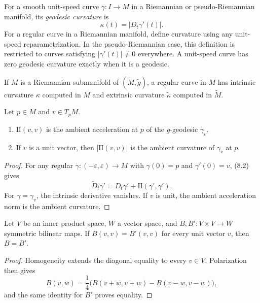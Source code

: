 For a smooth unit-speed curve $\gamma:I\to M$ in a Riemannian or
pseudo-Riemannian manifold, its \emph{geodesic curvature} is
\[
\kappa(t)=|D_t\gamma'(t)|.
\]
For a regular curve in a Riemannian manifold, define curvature using any
unit-speed reparametrization. In the pseudo-Riemannian case, this definition
is restricted to curves satisfying $|\gamma'(t)|\neq0$ everywhere. A
unit-speed curve has zero geodesic curvature exactly when it is a geodesic.

If $M$ is a Riemannian submanifold of
$(\widetilde M,\widetilde g)$, a regular curve in $M$ has intrinsic curvature
$\kappa$ computed in $M$ and extrinsic curvature $\widetilde\kappa$ computed
in $\widetilde M$.

\begin{proposition}
\label{prop:geometric-interpretation-ii}

Let $p\in M$ and $v\in T_pM$.
\begin{enumerate}
\item[(a)] $\mathrm{II}(v,v)$ is the ambient acceleration at $p$ of the
$g$-geodesic $\gamma_v$.
\item[(b)] If $v$ is a unit vector, then $|\mathrm{II}(v,v)|$ is the ambient
curvature of $\gamma_v$ at $p$.
\end{enumerate}
\end{proposition}

\begin{proof}
\sketch For any regular $\gamma:(-\varepsilon,\varepsilon)\to M$ with
$\gamma(0)=p$ and $\gamma'(0)=v$, (8.2) gives
\[
\widetilde D_t\gamma'
=D_t\gamma'+\mathrm{II}(\gamma',\gamma').
\]
For $\gamma=\gamma_v$, the intrinsic derivative vanishes. If $v$ is unit,
the ambient acceleration norm is the ambient curvature.
\end{proof}

\begin{lemma}
\label{lem:symmetric-bilinear-form-unit-vectors}

Let $V$ be an inner product space, $W$ a vector space, and
$B,B':V\times V\to W$ symmetric bilinear maps. If
$B(v,v)=B'(v,v)$ for every unit vector $v$, then $B=B'$.
\end{lemma}

\begin{proof}
\sketch Homogeneity extends the diagonal equality to every $v\in V$.
Polarization then gives
\[
B(v,w)=\frac14\bigl(B(v+w,v+w)-B(v-w,v-w)\bigr),
\]
and the same identity for $B'$ proves equality.
\end{proof}

